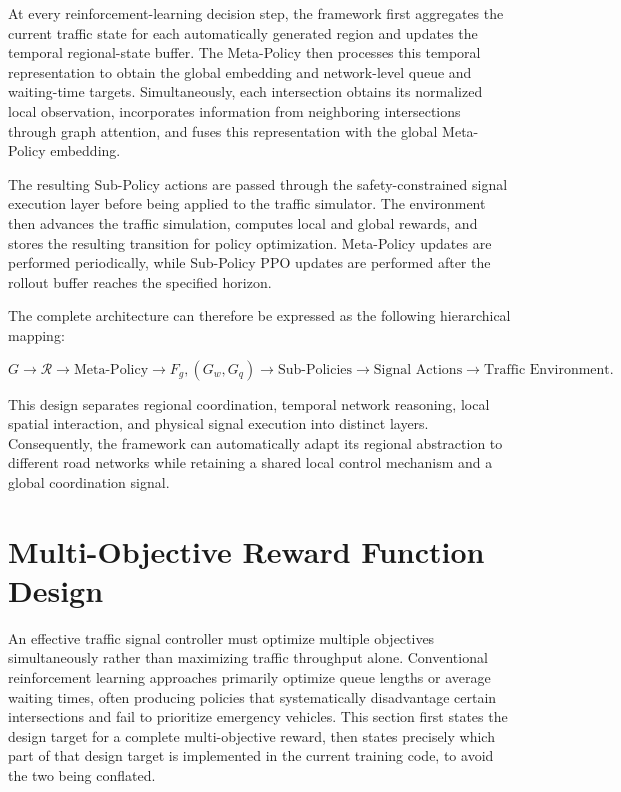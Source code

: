 \documentclass[3p,times]{elsarticle}
\theoremstyle{plain}
\theoremstyle{definition}
\begin{document}
At every reinforcement-learning decision step, the framework first
aggregates the current traffic state for each automatically generated
region and updates the temporal regional-state buffer. The Meta-Policy
then processes this temporal representation to obtain the global
embedding and network-level queue and waiting-time targets.
Simultaneously, each intersection obtains its normalized local
observation, incorporates information from neighboring intersections
through graph attention, and fuses this representation with the global
Meta-Policy embedding.

The resulting Sub-Policy actions are passed through the
safety-constrained signal execution layer before being applied to the
traffic simulator. The environment then advances the traffic
simulation, computes local and global rewards, and stores the
resulting transition for policy optimization. Meta-Policy updates are
performed periodically, while Sub-Policy PPO updates are performed
after the rollout buffer reaches the specified horizon.

The complete architecture can therefore be expressed as the following
hierarchical mapping:

\begin{equation}
G \rightarrow \mathcal{R} \rightarrow \text{Meta-Policy} \rightarrow
F_g, (G_w, G_q) \rightarrow \text{Sub-Policies} \rightarrow \text{Signal Actions}
\rightarrow \text{Traffic Environment}.
\end{equation}

This design separates regional coordination, temporal network
reasoning, local spatial interaction, and physical signal execution
into distinct layers. Consequently, the framework can automatically
adapt its regional abstraction to different road networks while
retaining a shared local control mechanism and a global coordination
signal.



\section{Multi-Objective Reward Function Design}\label{sec4}

An effective traffic signal controller must optimize multiple
objectives simultaneously rather than maximizing traffic throughput
alone. Conventional reinforcement learning approaches primarily
optimize queue lengths or average waiting times, often producing
policies that systematically disadvantage certain intersections and
fail to prioritize emergency vehicles. This section first states the
design target for a complete multi-objective reward, then states
precisely which part of that design target is implemented in the
current training code, to avoid the two being conflated.
\end{document}
